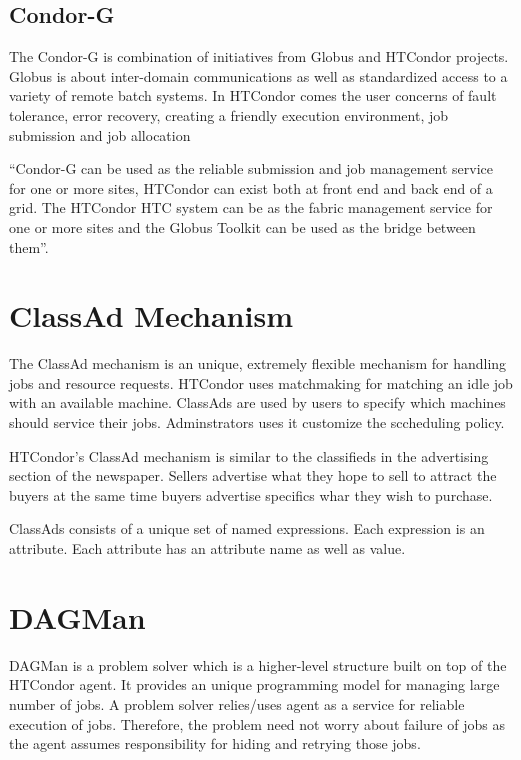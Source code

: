 \documentclass[9pt,twocolumn,twoside]{../../styles/osajnl}
\begin{document}
\subsection{Condor-G}

The Condor-G is combination of initiatives from Globus and HTCondor
projects. Globus is about inter-domain communications as well as
standardized access to a variety of remote batch
systems\cite{Globus1997article}. In HTCondor comes the user concerns
of fault tolerance, error recovery, creating a friendly execution
environment, job submission and job allocation

``Condor-G can be used as the reliable submission and job management
service for one or more sites, HTCondor can exist both at front end
and back end of a grid. The HTCondor HTC system can be as the fabric
management service for one or more sites and the Globus Toolkit can be
used as the bridge between them''\cite{condor-practice}.

\section{ClassAd Mechanism}
The ClassAd mechanism is an unique, extremely flexible mechanism for
handling jobs and resource requests. HTCondor uses matchmaking for
matching an idle job with an available machine. ClassAds are used by
users to specify which machines should service their
jobs. Adminstrators uses it customize the sccheduling policy.

HTCondor's ClassAd mechanism is similar to the classifieds in the
advertising section of the newspaper. Sellers advertise what they hope
to sell to attract the buyers at the same time buyers advertise
specifics whar they wish to purchase.

ClassAds consists of a unique set of named expressions. Each
expression is an attribute. Each attribute has an attribute name as
well as value\cite{ClassAddstechreport2003}.

\section{DAGMan}
DAGMan is a problem solver which is a higher-level structure built on
top of the HTCondor agent. It provides an unique programming model for
managing large number of jobs. A problem solver relies/uses agent as a
service for reliable execution of jobs. Therefore, the problem need
not worry about failure of jobs as the agent assumes responsibility
for hiding and retrying those jobs.
\end{document}
